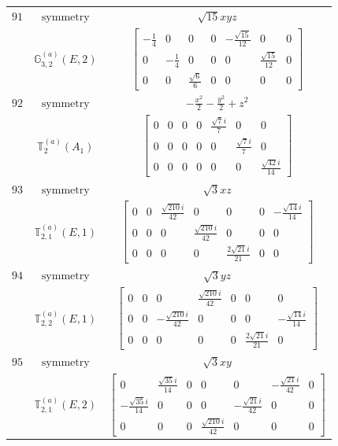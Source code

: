 \documentclass[fleqn,8pt,landscape]{jsarticle}
\begin{document}
\begin{longtable}{ccc}
$ 91 $ & $ \text{symmetry} $ & $ \sqrt{15} x y z $ \\
$  $ & $ \mathbb{G}_{3,2}^{(a)}(E,2) $ & $ \begin{bmatrix} - \frac{1}{4} & 0 & 0 & 0 & - \frac{\sqrt{15}}{12} & 0 & 0 \\ 0 & - \frac{1}{4} & 0 & 0 & 0 & \frac{\sqrt{15}}{12} & 0 \\ 0 & 0 & \frac{\sqrt{6}}{6} & 0 & 0 & 0 & 0 \end{bmatrix} $ \\ \hline
$ 92 $ & $ \text{symmetry} $ & $ - \frac{x^{2}}{2} - \frac{y^{2}}{2} + z^{2} $ \\
$  $ & $ \mathbb{T}_{2}^{(a)}(A_{1}) $ & $ \begin{bmatrix} 0 & 0 & 0 & 0 & \frac{\sqrt{7} i}{7} & 0 & 0 \\ 0 & 0 & 0 & 0 & 0 & \frac{\sqrt{7} i}{7} & 0 \\ 0 & 0 & 0 & 0 & 0 & 0 & \frac{\sqrt{42} i}{14} \end{bmatrix} $ \\ \hline
$ 93 $ & $ \text{symmetry} $ & $ \sqrt{3} x z $ \\
$  $ & $ \mathbb{T}_{2,1}^{(a)}(E,1) $ & $ \begin{bmatrix} 0 & 0 & \frac{\sqrt{210} i}{42} & 0 & 0 & 0 & - \frac{\sqrt{14} i}{14} \\ 0 & 0 & 0 & \frac{\sqrt{210} i}{42} & 0 & 0 & 0 \\ 0 & 0 & 0 & 0 & \frac{2 \sqrt{21} i}{21} & 0 & 0 \end{bmatrix} $ \\ \hline
$ 94 $ & $ \text{symmetry} $ & $ \sqrt{3} y z $ \\
$  $ & $ \mathbb{T}_{2,2}^{(a)}(E,1) $ & $ \begin{bmatrix} 0 & 0 & 0 & \frac{\sqrt{210} i}{42} & 0 & 0 & 0 \\ 0 & 0 & - \frac{\sqrt{210} i}{42} & 0 & 0 & 0 & - \frac{\sqrt{14} i}{14} \\ 0 & 0 & 0 & 0 & 0 & \frac{2 \sqrt{21} i}{21} & 0 \end{bmatrix} $ \\ \hline
$ 95 $ & $ \text{symmetry} $ & $ \sqrt{3} x y $ \\
$  $ & $ \mathbb{T}_{2,1}^{(a)}(E,2) $ & $ \begin{bmatrix} 0 & \frac{\sqrt{35} i}{14} & 0 & 0 & 0 & - \frac{\sqrt{21} i}{42} & 0 \\ - \frac{\sqrt{35} i}{14} & 0 & 0 & 0 & - \frac{\sqrt{21} i}{42} & 0 & 0 \\ 0 & 0 & 0 & \frac{\sqrt{210} i}{42} & 0 & 0 & 0 \end{bmatrix} $ \\ \hline

\end{longtable}
\end{document}

